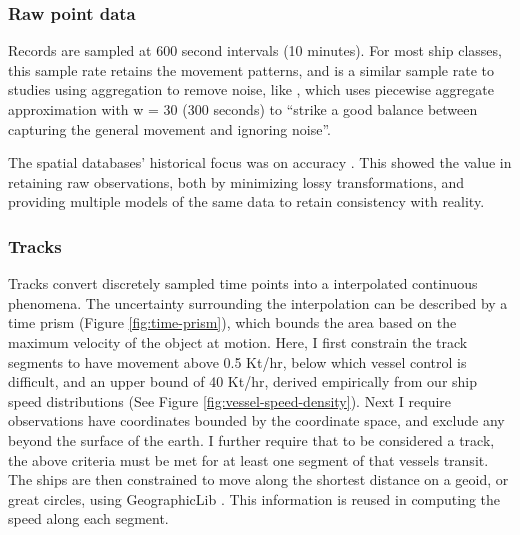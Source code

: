 \subsubsection{Raw point data}


Records are sampled at 600 second intervals (10 minutes). For most ship classes, this sample rate retains the movement patterns, and is a similar sample rate to studies using aggregation to remove noise, like \citep{Vries2009}, which uses piecewise aggregate approximation with w = 30 (300 seconds) to ``strike a good balance between capturing the general movement and ignoring noise''. %

The spatial databases' historical focus was on accuracy \citep{goodchild1989accuracy}. This showed the value in retaining raw observations, both by minimizing lossy transformations, and providing multiple models of the same data to retain consistency with reality.

\subsubsection{Tracks}

Tracks convert discretely sampled time points into a interpolated continuous phenomena. The uncertainty surrounding the interpolation can be described by a time prism (Figure \ref{fig:time-prism}), which bounds the area based on the maximum velocity of the object at motion. Here, I first constrain the track segments to have movement above 0.5 Kt/hr, below which vessel control is difficult, and an upper bound of 40 Kt/hr, derived empirically from our ship speed distributions (See Figure \ref{fig:vessel-speed-density}). Next I require observations have coordinates bounded by the coordinate space, and exclude any beyond the surface of the earth. I further require that to be considered a track, the above criteria must be met for at least one segment of that vessels transit. The ships are then constrained to move along the shortest distance on a geoid, or great circles, using GeographicLib \citep{karney2012algorithms}. This information is reused in computing the speed along each segment.

